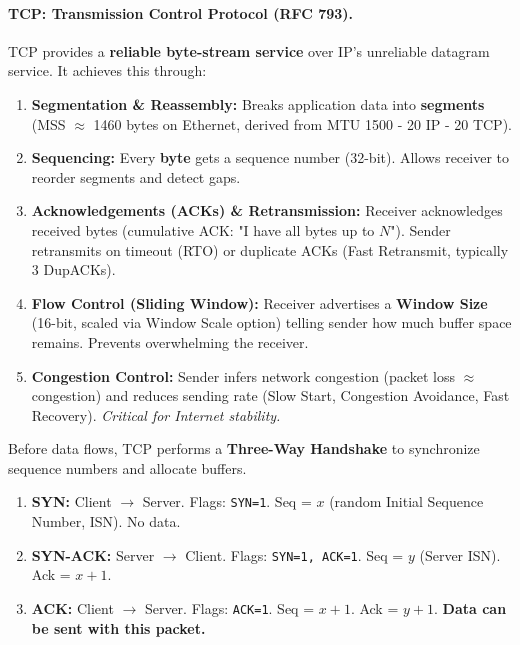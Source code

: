 \documentclass[11pt]{article}
\begin{document}
\paragraph{TCP: Transmission Control Protocol (RFC 793).}
TCP provides a \textbf{reliable byte-stream service} over IP's unreliable datagram service. It achieves this through:
\begin{enumerate}
    \item \textbf{Segmentation \& Reassembly:} Breaks application data into \textbf{segments} (MSS $\approx$ 1460 bytes on Ethernet, derived from MTU 1500 - 20 IP - 20 TCP).
    \item \textbf{Sequencing:} Every \textbf{byte} gets a sequence number (32-bit). Allows receiver to reorder segments and detect gaps.
    \item \textbf{Acknowledgements (ACKs) \& Retransmission:} Receiver acknowledges received bytes (cumulative ACK: "I have all bytes up to $N$"). Sender retransmits on timeout (RTO) or duplicate ACKs (Fast Retransmit, typically 3 DupACKs).
    \item \textbf{Flow Control (Sliding Window):} Receiver advertises a \textbf{Window Size} (16-bit, scaled via Window Scale option) telling sender how much buffer space remains. Prevents overwhelming the receiver.
    \item \textbf{Congestion Control:} Sender infers network congestion (packet loss $\approx$ congestion) and reduces sending rate (Slow Start, Congestion Avoidance, Fast Recovery). \textit{Critical for Internet stability.}
\end{enumerate}

\begin{experience}
Before data flows, TCP performs a \textbf{Three-Way Handshake} to synchronize sequence numbers and allocate buffers.
\begin{enumerate}
    \item \textbf{SYN:} Client $\to$ Server. Flags: \texttt{SYN=1}. Seq = $x$ (random Initial Sequence Number, ISN). No data.
    \item \textbf{SYN-ACK:} Server $\to$ Client. Flags: \texttt{SYN=1, ACK=1}. Seq = $y$ (Server ISN). Ack = $x+1$.
    \item \textbf{ACK:} Client $\to$ Server. Flags: \texttt{ACK=1}. Seq = $x+1$. Ack = $y+1$. \textbf{Data can be sent with this packet.}
\end{enumerate}
\end{experience}
\end{document}
